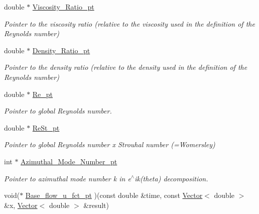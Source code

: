\begin{DoxyCompactItemize}
\item 
double $\ast$ \hyperlink{classoomph_1_1LinearisedAxisymmetricNavierStokesEquations_abd8c0a45662c1fb4cb938a38f97751be}{Viscosity\+\_\+\+Ratio\+\_\+pt}
\begin{DoxyCompactList}\small\item\em Pointer to the viscosity ratio (relative to the viscosity used in the definition of the Reynolds number) \end{DoxyCompactList}\item 
double $\ast$ \hyperlink{classoomph_1_1LinearisedAxisymmetricNavierStokesEquations_a463f64ca0702b8121df6df454a1ae362}{Density\+\_\+\+Ratio\+\_\+pt}
\begin{DoxyCompactList}\small\item\em Pointer to the density ratio (relative to the density used in the definition of the Reynolds number) \end{DoxyCompactList}\item 
double $\ast$ \hyperlink{classoomph_1_1LinearisedAxisymmetricNavierStokesEquations_a905e8cf4a0a4bafaf64361331fc10905}{Re\+\_\+pt}
\begin{DoxyCompactList}\small\item\em Pointer to global Reynolds number. \end{DoxyCompactList}\item 
double $\ast$ \hyperlink{classoomph_1_1LinearisedAxisymmetricNavierStokesEquations_a80b3ada509bf8c727ea1280e7e1191f7}{Re\+St\+\_\+pt}
\begin{DoxyCompactList}\small\item\em Pointer to global Reynolds number x Strouhal number (=Womersley) \end{DoxyCompactList}\item 
int $\ast$ \hyperlink{classoomph_1_1LinearisedAxisymmetricNavierStokesEquations_a5d8532b74a9312088dc8e8f04c27eee6}{Azimuthal\+\_\+\+Mode\+\_\+\+Number\+\_\+pt}
\begin{DoxyCompactList}\small\item\em Pointer to azimuthal mode number k in e$^\wedge$ik(theta) decomposition. \end{DoxyCompactList}\item 
void($\ast$ \hyperlink{classoomph_1_1LinearisedAxisymmetricNavierStokesEquations_adc7e42339ffbab2d91642243c79a1439}{Base\+\_\+flow\+\_\+u\+\_\+fct\+\_\+pt} )(const double \&time, const \hyperlink{classoomph_1_1Vector}{Vector}$<$ double $>$ \&x, \hyperlink{classoomph_1_1Vector}{Vector}$<$ double $>$ \&result)

\end{DoxyCompactItemize}
